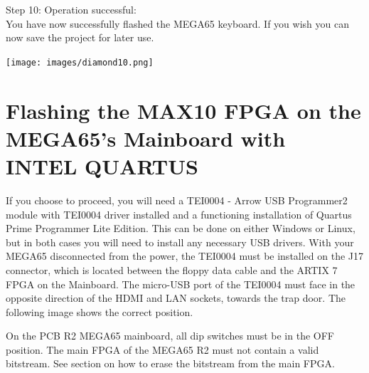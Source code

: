 \vspace{5mm}

\begin{minipage}{\linewidth}
Step 10: Operation successful: \\
You have now successfully flashed the MEGA65 keyboard.
If you wish you can now save the project for later use.
  \begin{center}
  \texttt{[image: images/diamond10.png]}
  \end{center}
\end{minipage}


\section{Flashing the MAX10 FPGA on the MEGA65's Mainboard with INTEL QUARTUS}

If you choose to proceed, you will need a TEI0004 - Arrow USB Programmer2 module with TEI0004 driver installed
and a functioning installation of Quartus Prime Programmer Lite Edition.  This can be done on either Windows
or Linux, but in both cases you will need to install any necessary USB drivers.
With your MEGA65 disconnected from the power, the TEI0004 must be installed on the J17 connector,
which is located between the floppy data cable and the ARTIX 7 FPGA on the Mainboard.
The micro-USB port of the TEI0004 must face in the opposite direction of the HDMI and LAN sockets, towards
the trap door.
The following image shows the correct position.

On the PCB R2 MEGA65 mainboard, all dip switches must be in the OFF position. The main FPGA of the MEGA65 R2 must not contain
a valid bitstream. See section  on how to erase the bitstream
from the main FPGA.

